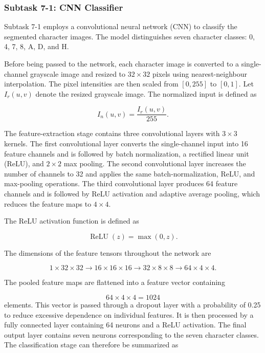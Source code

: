 \documentclass[11pt,a4paper]{article}
\begin{document}
\subsubsection{Subtask 7-1: CNN Classifier}

Subtask 7-1 employs a convolutional neural network (CNN) to classify the
segmented character images. The model distinguishes seven character
classes: 0, 4, 7, 8, A, D, and H.

Before being passed to the network, each character image is converted
to a single-channel grayscale image and resized to $32\times32$ pixels
using nearest-neighbour interpolation. The pixel intensities are then
scaled from $[0,255]$ to $[0,1]$. Let $I_r(u,v)$ denote the resized
grayscale image. The normalized input is defined as

\begin{equation}
I_n(u,v)=\frac{I_r(u,v)}{255}.
\label{eq:cnn_normalization}
\end{equation}

The feature-extraction stage contains three convolutional layers with
$3\times3$ kernels. The first convolutional layer converts the
single-channel input into 16 feature channels and is followed by batch
normalization, a rectified linear unit (ReLU), and $2\times2$ max
pooling. The second convolutional layer increases the number of
channels to 32 and applies the same batch-normalization, ReLU, and
max-pooling operations. The third convolutional layer produces 64
feature channels and is followed by ReLU activation and adaptive
average pooling, which reduces the feature maps to $4\times4$.

The ReLU activation function is defined as

\begin{equation}
\operatorname{ReLU}(z)=\max(0,z).
\label{eq:relu}
\end{equation}

The dimensions of the feature tensors throughout the network are

\begin{equation}
1\times32\times32
\rightarrow
16\times16\times16
\rightarrow
32\times8\times8
\rightarrow
64\times4\times4.
\label{eq:cnn_dimensions}
\end{equation}

The pooled feature maps are flattened into a feature vector containing

\begin{equation}
64\times4\times4=1024
\label{eq:flattened_features}
\end{equation}
elements. This vector is passed through a dropout layer with a
probability of 0.25 to reduce excessive dependence on individual
features. It is then processed by a fully connected layer containing
64 neurons and a ReLU activation. The final output layer contains
seven neurons corresponding to the seven character classes. The
classification stage can therefore be summarized as
\end{document}
